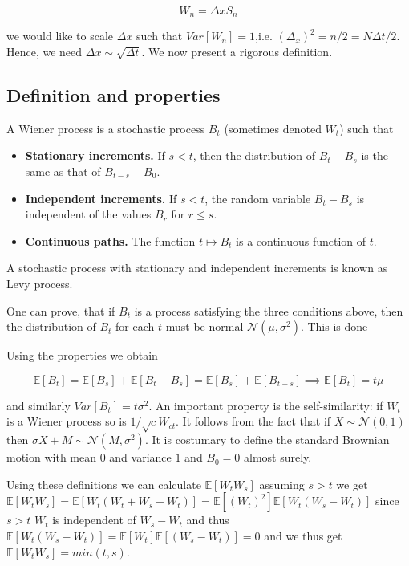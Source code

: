 \documentclass[11pt,a4paper]{article}
\begin{document}
\begin{equation}
    W_n = \Delta x S_n
\end{equation}

we would like to scale $\Delta x$ such that $Var[W_n]=1$,i.e. $(\Delta_x)^2 = n/2 = N \Delta t/2 $. Hence, we need $\Delta x \sim  \sqrt{\Delta t}$.
We now present a rigorous definition.

\subsection{Definition and properties}
A Wiener process is a stochastic process $B_t$ (sometimes denoted $W_t$) such that

\begin{itemize}
    \item \textbf{Stationary increments.} If $s < t$, then the distribution of $B_t - B_s$ is the same as that of $B_{t-s} - B_0$.
    \item \textbf{Independent increments.} If $s < t$, the random variable $B_t - B_s$ is independent of the values $B_r$ for $r \leq s$.
    \item \textbf{Continuous paths.} The function $t \mapsto B_t$ is a continuous function of $t$.
\end{itemize}

A stochastic process with stationary and independent increments is known as Levy process.

One can prove, that if $B_t$ is a process satisfying the three conditions above, then the distribution of $B_t$ for each $t$ must be normal $\mathcal{N}(\mu,\sigma^2)$. This is done

Using the properties we obtain

\begin{equation}
\mathbb{E}[B_t] = \mathbb{E}[B_s]+ \mathbb{E}[B_t-B_s] = \mathbb{E}[B_s]+ \mathbb{E}[B_{t-s}] \implies \mathbb{E}[B_t] = t \mu
\end{equation}

and similarly $Var[B_t] = t \sigma^2$. An important property is the self-similarity: if $W_t$ is a Wiener process so is $1/\sqrt{c}W_{ct}$. It follows from the fact that if $X \sim \mathcal{N}(0,1)$ then  $\sigma X +M  \sim \mathcal{N}(M,\sigma^2)$. It is costumary to define the standard Brownian motion with mean $0$ and variance $1$ and $B_0=0$ almost surely. 

Using these definitions we can calculate $\mathbb{E}[W_tW_s]$ assuming $s>t$ we get $\mathbb{E}[W_tW_s] = \mathbb{E}[W_t(W_t+W_s-W_t)] = \mathbb{E}[(W_t)^2] \mathbb{E}[W_t(W_s-W_t)]$
since $s>t$ $W_t$ is independent of $W_s-W_t$ and thus $\mathbb{E}[W_t(W_s-W_t)] = \mathbb{E}[W_t]\mathbb{E}[(W_s-W_t)] = 0$ and we thus get $\mathbb{E}[W_tW_s] = min(t,s)$. 
\end{document}

